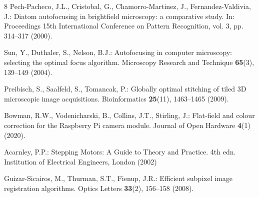 \documentclass[runningheads]{llncs}
\begin{document}
\begin{thebibliography}{8}
Pech-Pacheco, J.L., Cristobal, G., Chamorro-Martinez, J., Fernandez-Valdivia, J.: Diatom autofocusing in brightfield microscopy: a comparative study. In: Proceedings 15th International Conference on Pattern Recognition, vol. 3, pp. 314--317 (2000). 

Sun, Y., Duthaler, S., Nelson, B.J.: Autofocusing in computer microscopy: selecting the optimal focus algorithm. Microscopy Research and Technique \textbf{65}(3), 139--149 (2004). 

Preibisch, S., Saalfeld, S., Tomancak, P.: Globally optimal stitching of tiled 3D microscopic image acquisitions. Bioinformatics \textbf{25}(11), 1463--1465 (2009). 

Bowman, R.W., Vodenicharski, B., Collins, J.T., Stirling, J.: Flat-field and colour correction for the Raspberry Pi camera module. Journal of Open Hardware \textbf{4}(1) (2020). 

Acarnley, P.P.: Stepping Motors: A Guide to Theory and Practice. 4th edn. Institution of Electrical Engineers, London (2002)

Guizar-Sicairos, M., Thurman, S.T., Fienup, J.R.: Efficient subpixel image registration algorithms. Optics Letters \textbf{33}(2), 156--158 (2008). 

\end{thebibliography}
\end{document}
